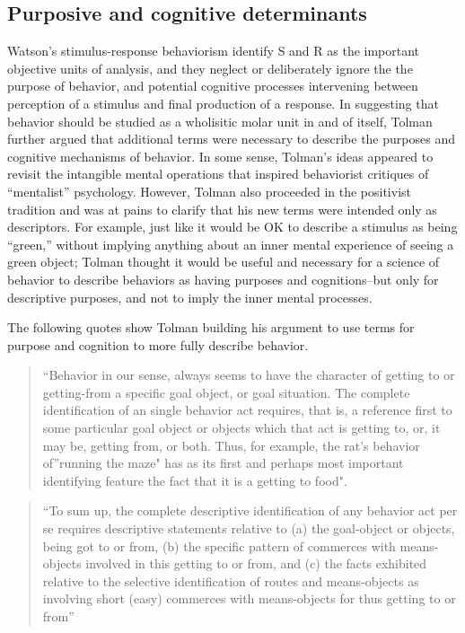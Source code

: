 \documentclass[
  oneside,
  12pt]{crumpbook}
\begin{document}
\hypertarget{purposive-and-cognitive-determinants}{%
\subsection{Purposive and cognitive determinants}\label{purposive-and-cognitive-determinants}}

Watson's stimulus-response behaviorism identify S and R as the important objective units of analysis, and they neglect or deliberately ignore the the purpose of behavior, and potential cognitive processes intervening between perception of a stimulus and final production of a response. In suggesting that behavior should be studied as a wholisitic molar unit in and of itself, Tolman further argued that additional terms were necessary to describe the purposes and cognitive mechanisms of behavior. In some sense, Tolman's ideas appeared to revisit the intangible mental operations that inspired behaviorist critiques of ``mentalist'' psychology. However, Tolman also proceeded in the positivist tradition and was at pains to clarify that his new terms were intended only as descriptors. For example, just like it would be OK to describe a stimulus as being ``green,'' without implying anything about an inner mental experience of seeing a green object; Tolman thought it would be useful and necessary for a science of behavior to describe behaviors as having purposes and cognitions--but only for descriptive purposes, and not to imply the inner mental processes.

The following quotes show Tolman building his argument to use terms for purpose and cognition to more fully describe behavior.

\begin{quote}
``Behavior in our sense, always seems to have the character of getting to or getting-from a specific goal object, or goal situation. The complete identification of an single behavior act requires, that is, a reference first to some particular goal object or objects which that act is getting to, or, it may be, getting from, or both. Thus, for example, the rat's behavior of''running the maze" has as its first and perhaps most important identifying feature the fact that it is a getting to food".
\end{quote}

\begin{quote}
``To sum up, the complete descriptive identification of any behavior act per se requires descriptive statements relative to (a) the goal-object or objects, being got to or from, (b) the specific pattern of commerces with means-objects involved in this getting to or from, and (c) the facts exhibited relative to the selective identification of routes and means-objects as involving short (easy) commerces with means-objects for thus getting to or from''
\end{quote}
\end{document}
